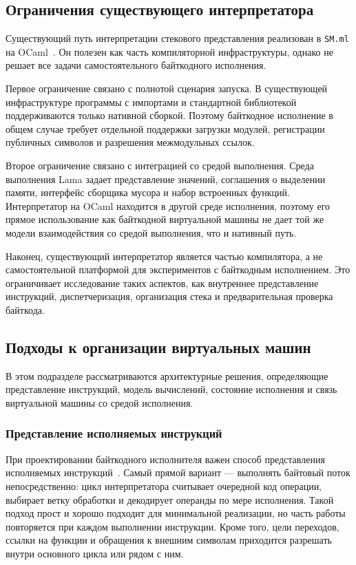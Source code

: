 \subsection{Ограничения существующего интерпретатора}

Существующий путь интерпретации стекового представления реализован в
\verb=SM.ml= на OCaml~\cite{LamaInterpreter,OCamlManual}. Он полезен как часть
компиляторной инфраструктуры, однако не решает все задачи самостоятельного
байткодного исполнения.

Первое ограничение связано с полнотой сценария запуска. В существующей
инфраструктуре программы с импортами и стандартной библиотекой поддерживаются
только нативной сборкой. Поэтому байткодное исполнение в общем случае требует
отдельной поддержки загрузки модулей, регистрации публичных символов и
разрешения межмодульных ссылок.

Второе ограничение связано с интеграцией со средой выполнения. Среда
выполнения Lama задает представление значений, соглашения о выделении памяти,
интерфейс сборщика мусора и набор встроенных функций. Интерпретатор на OCaml находится в
другой среде исполнения, поэтому его прямое использование как байткодной
виртуальной машины не дает той же модели взаимодействия со средой выполнения,
что и нативный путь.

Наконец, существующий интерпретатор является частью компилятора, а не
самостоятельной платформой для экспериментов с байткодным исполнением. Это
ограничивает исследование таких аспектов, как внутреннее представление
инструкций, диспетчеризация, организация стека и предварительная проверка
байткода. 

\subsection{Подходы к организации виртуальных машин}

В этом подразделе рассматриваются архитектурные решения, определяющие представление инструкций, модель вычислений, состояние исполнения и связь виртуальной машины со средой исполнения.

\subsubsection{Представление исполняемых инструкций}
При проектировании байткодного исполнителя важен способ представления
исполняемых инструкций~\cite{Shi}. Самый прямой вариант --- выполнять байтовый
поток непосредственно: цикл интерпретатора считывает очередной код операции,
выбирает ветку обработки и декодирует операнды по мере исполнения. Такой
подход прост и хорошо подходит для минимальной реализации, но часть работы
повторяется при каждом выполнении инструкции. Кроме того, цели переходов,
ссылки на функции и обращения к внешним символам приходится разрешать внутри
основного цикла или рядом с ним.

